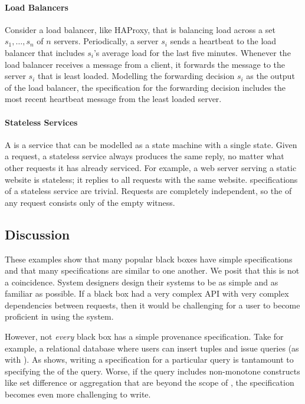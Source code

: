 \paragraph{Load Balancers}
Consider a load balancer, like HAProxy, that is balancing load across a set
$s_1, \ldots, s_n$ of $n$ servers. Periodically, a server $s_i$ sends a
heartbeat to the load balancer that includes $s_i$'s average load for the last
five minutes. Whenever the load balancer receives a message from a client, it
forwards the message to the server $s_i$ that is least loaded. Modelling the
forwarding decision $s_i$ as the output of the load balancer, the
\watprovenance{} specification for the forwarding decision includes the most
recent heartbeat message from the least loaded server.

\paragraph{Stateless Services}
A  is a service that can be modelled as a state
machine with a single state. Given a request, a stateless service always
produces the same reply, no matter what other requests it has already serviced.
For example, a web server serving a static website is stateless; it replies to
all requests with the same website. \Watprovenance{} specifications of a
stateless service are trivial. Requests are completely independent, so the
\watprovenance{} of any request consists only of the empty witness.

\subsection{Discussion}
These examples show that many popular black boxes have simple \watprovenance{}
specifications and that many \watprovenance{} specifications are similar to one
another. We posit that this is not a coincidence. System designers
design their systems to be as simple and as familiar as possible. If a black
box had a very complex API with very complex dependencies between requests,
then it would be challenging for a user to become proficient in using the
system.

However, not \emph{every} black box has a simple provenance specification. Take
for example, a relational database where users can insert tuples and issue
queries (as with ). As 
shows, writing a \watprovenance{} specification for a particular query is
tantamount to specifying the \whyprovenance{} of the query. Worse, if the
query includes non-monotone constructs like set difference or aggregation that are beyond
the scope of \whyprovenance{}, the \watprovenance{} specification becomes even
more challenging to write.

